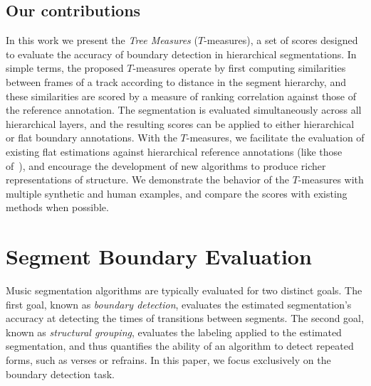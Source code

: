 \documentclass{article}
\begin{document}
\subsection{Our contributions}
In this work we present the \emph{Tree Measures} ($T$-measures), a set of scores designed to evaluate the accuracy of boundary detection in hierarchical segmentations.
In simple terms, the proposed $T$-measures operate by first computing similarities between frames of a track according to distance in the segment hierarchy, and these similarities are scored by
a measure of ranking correlation against those of the reference annotation.
The segmentation is evaluated simultaneously across all hierarchical layers, and the resulting scores can be applied to either hierarchical or flat boundary annotations.
With the $T$-measures, we facilitate the evaluation of existing flat estimations against hierarchical reference annotations (like those of~\cite{Smith2011}), and encourage the development of new algorithms
to produce richer representations of structure.
We demonstrate the behavior of the $T$-measures with multiple synthetic and human examples, and compare the scores with existing methods when possible.


\section{Segment Boundary Evaluation}\label{sec:curr_meth}

Music segmentation algorithms are typically evaluated for two distinct goals.  
The first goal, known as \emph{boundary detection}, evaluates the estimated segmentation's accuracy at detecting the times of transitions between segments.
The second goal, known as \emph{structural grouping}, evaluates the labeling applied to the estimated segmentation, and thus quantifies the ability of an
algorithm to detect repeated forms, such as verses or refrains. 
In this paper, we focus exclusively on the boundary detection task.
\end{document}
